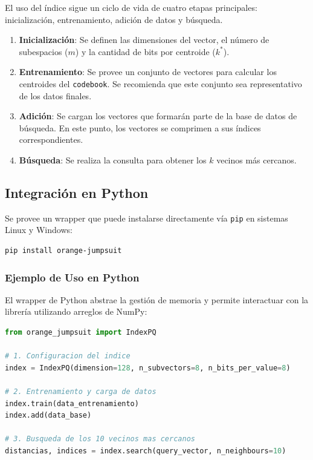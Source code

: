 El uso del \'indice sigue un ciclo de vida de cuatro etapas principales:
inicialización, entrenamiento, adición de datos y búsqueda.

\begin{enumerate}
    \item \textbf{Inicialización}: 
      Se definen las dimensiones del vector, el número de subespacios ($m$)
      y la cantidad de bits por centroide ($k^*$).
    \item \textbf{Entrenamiento}: 
      Se provee un conjunto de vectores para calcular los centroides del
      \verb|codebook|. 
      Se recomienda que este conjunto sea representativo de los datos 
      finales.
    \item \textbf{Adici\'on}: 
      Se cargan los vectores que formar\'an parte de la base de datos de 
      b\'usqueda. En este punto, los vectores se comprimen a sus \'indices
      correspondientes.
    \item \textbf{B\'usqueda}: 
      Se realiza la consulta para obtener los $k$ vecinos m\'as cercanos.
\end{enumerate}

\subsection{Integraci\'on en Python}

Se provee un wrapper que puede instalarse directamente vía \texttt{pip} en
sistemas Linux y Windows:

\begin{lstlisting}[language=bash]
pip install orange-jumpsuit
\end{lstlisting}

\subsubsection{Ejemplo de Uso en Python}
El wrapper de Python abstrae la gesti\'on de memoria y permite interactuar con
la librer\'ia utilizando arreglos de NumPy:

\begin{lstlisting}[language=python]
from orange_jumpsuit import IndexPQ

# 1. Configuracion del indice
index = IndexPQ(dimension=128, n_subvectors=8, n_bits_per_value=8)

# 2. Entrenamiento y carga de datos
index.train(data_entrenamiento)
index.add(data_base)

# 3. Busqueda de los 10 vecinos mas cercanos
distancias, indices = index.search(query_vector, n_neighbours=10)
\end{lstlisting}

